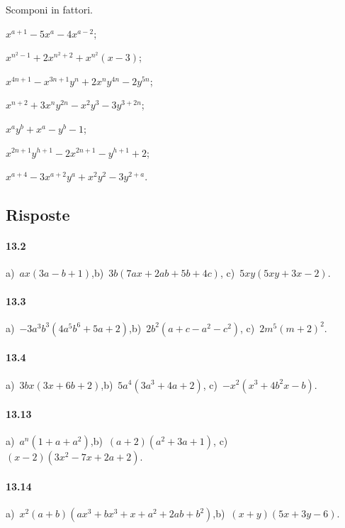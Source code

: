 \begin{esercizio}[\Ast]
 \label{ese:13.134}
 Scomponi in fattori.
 \begin{multicols}{2}
 \begin{enumeratea}
  \item $x^{a+1}-5x^{a}-4x^{a-2}$;
\item $x^{n^{2}-1}+2x^{n^{2}+2}+x^{n^{2}}(x-3)$;
\item $x^{4n+1}-x^{3n+1}y^{n}+2x^{n}y^{4n}-2y^{5n}$;
\item $x^{n+2}+3x^{n}y^{2n}-x^{2}y^{3}-3y^{3+2n}$;
\item $x^{a}y^{b}+x^{a}-y^{b}-1$;
\item $x^{2n+1}y^{h+1}-2x^{2n+1}-y^{h+1}+2$;
\item $x^{a+4}-3x^{a+2}y^{a}+x^{2}y^{2}-3y^{2+a}$.
 \end{enumeratea}
 \end{multicols}
\end{esercizio}

\subsection{Risposte}

\paragraph{13.2}
a)~$ax(3a-b+1)$,\quad b)~$3b(7ax+2ab+5b+4c)$, \quad c)~$5xy(5xy+3x-2)$.

\paragraph{13.3}
a)~$-3a^{3}b^{3}\left(4a^{5}b^{6}+5a+2\right)$,\quad b)~$2b^{2}(a+c-a^{2}-c^{2})$, \quad c)~$2m^{5}\left(m+2\right)^{2}$.

\paragraph{13.4}
a)~$3bx(3x+6b+2)$,\quad b)~$5a^{4}\left(3a^{3}+4a+2\right)$, \quad c)~$-x^{2}\left(x^{3}+4b^{2}x-b\right)$.

\paragraph{13.13}
a)~$a^{n}(1+a+a^{2})$,\quad b)~$(a+2)\left(a^{2}+3a+1\right)$, \quad c)~$(x-2)\left(3x^2-7x+2a+2\right)$.

\paragraph{13.14}
a)~$x^{2}(a+b)(ax^{3}+bx^{3}+x+a^{2}+2ab+b^{2})$,\quad b)~$(x+y)\left(5x+3y-6\right)$.

